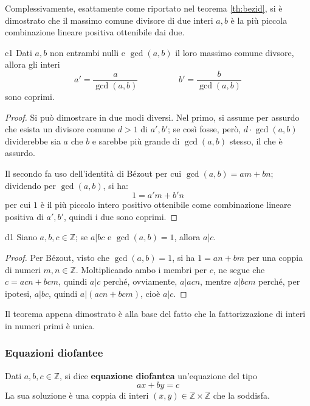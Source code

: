 \documentclass[11pt, a4paper]{scrartcl}
\theoremstyle{definition}
\numberwithin{esempio}{section}
\theoremstyle{definition}
\numberwithin{obs}{section}
\numberwithin{nota}{section}
\numberwithin{equation}{subsection}
\begin{document}
Complessivamente, esattamente come riportato nel teorema \ref{th:bezid}, si \`e dimostrato che il massimo comune divisore di due interi $a,b$ \`e la pi\`u piccola combinazione lineare positiva ottenibile dai due.
\begin{corollario}
	{}{c1}
	Dati $a,b$ non entrambi nulli e $\operatorname{gcd}(a,b) $ il loro massimo comune divsore, allora gli interi 
	\[
		a' = \frac{a}{\operatorname{gcd}(a,b) } \hspace{2cm} b' = \frac{b}{\operatorname{gcd}(a,b) }
	\] 
	sono coprimi.
	\begin{proof}
	Si pu\`o dimostrare in due modi diversi. Nel primo, si assume per assurdo che esista un divisore comune $d> 1 $ di $a' , b'$; se cos\`i fosse, per\`o, $d \cdot \operatorname{gcd}(a,b) $ dividerebbe sia $a$ che $b$ e sarebbe pi\`u grande di $\operatorname{gcd}(a,b) $ stesso, il che \`e assurdo.

	Il secondo fa uso dell'identit\`a di B\'ezout per cui $\operatorname{gcd}(a,b) = am+bn $; dividendo per $\operatorname{gcd}(a,b) $, si ha:
	\[
	1 = a'm + b'n 
	\] 
	per cui $1$ \`e il pi\`u piccolo intero positivo  ottenibile come combinazione lineare positiva di $a', b'$, quindi i due sono coprimi.
	\end{proof}
\end{corollario}
\begin{teorema}
	{}{d1}
	Siano $a,b,c \in \mathbb{Z}$; se $a|bc$ e $\operatorname{gcd}(a,b) =1$, allora $a|c$.
	\begin{proof}
		Per B\'ezout, visto che $\operatorname{gcd}(a,b) = 1$, si ha $1 = an + bm$ per una coppia di numeri $m,n \in \mathbb{Z}$. 
		Moltiplicando ambo i membri per $c$, ne segue che $c = acn + bcm$, quindi $a | c$ perch\'e, ovviamente, $a | acn$, mentre $a | bcm$ perch\'e, per ipotesi, $a | bc$, quindi $a| (acn + bcm)$, cio\`e $a | c$.
	\end{proof}
\end{teorema}
\noindent Il teorema appena dimostrato \`e alla base del fatto che la fattorizzazione di interi in numeri primi \`e unica.

\subsubsection{Equazioni diofantee}


Dati $a,b,c \in \mathbb{Z}$, si dice \textbf{equazione diofantea} un'equazione del tipo	
\begin{equation}
	ax + by = c
\end{equation}
La sua soluzione \`e una coppia di interi $(\overline{x},\overline{y}) \in \mathbb{Z} \times \mathbb{Z}$ che la soddisfa.
\end{document}
